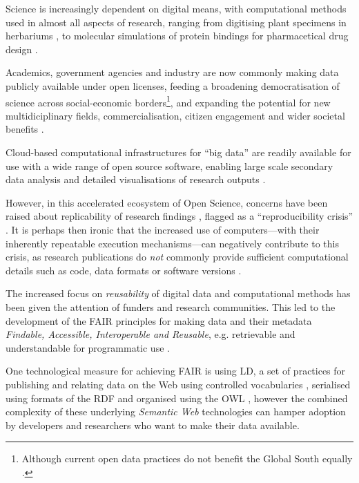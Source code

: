 Science is increasingly dependent on digital means, with computational methods used in almost all aspects of research, ranging from digitising plant specimens in herbariums \cite{Thiers 2016}, to molecular simulations of protein bindings for pharmacetical drug design \cite{Sledz 2018}. 

Academics, government agencies and industry are now commonly making data publicly available under open licenses, feeding a broadening democratisation of science \cite{Kitchin 2021} across social-economic borders\footnote{Although current open data practices do not benefit the Global South equally \cite{Serwadda 2018}.}, and expanding the potential for new multidiciplinary fields, commercialisation, citizen engagement and wider societal benefits \cite{Bisol 2014}.

Cloud-based computational infrastructures for ``big data'' are readily available for use with a wide range of open source software, enabling large scale secondary data analysis and detailed visualisations of research outputs \cite{Hashem 2015}.

However, in this accelerated ecosystem of Open Science, concerns have been raised about replicability of research findings \cite{Ioannidis 2005}, flagged as a ``reproducibility crisis'' \cite{Baker 2016}. It is perhaps then ironic that the increased use of computers---with their inherently repeatable execution mechanisms---can negatively contribute to this crisis, as research publications do \emph{not} commonly provide sufficient computational details such as code, data formats or software versions \cite{Stodden 2016}.

The increased focus on \emph{reusability} of digital data and computational methods has been given the attention of funders and research communities. This led to the development of the \acrshort{FAIR} principles for making data and their metadata \emph{Findable, Accessible, Interoperable and Reusable}, e.g. retrievable and understandable for programmatic use \cite{Wilkinson 2016}.

One technological measure for achieving FAIR is using \acrlong{LD}, a set of practices for publishing and relating data on the Web using controlled vocabularies \cite{Berners-Lee 2006}, serialised using formats of the \acrfull{RDF} \cite{Schreiber 2014} and organised using the \acrfull{OWL} \cite{W3C 2012}, however the combined complexity of these underlying \emph{Semantic Web} technologies can hamper adoption by developers \cite{Klímek 2019} and researchers who want to make their data available.

